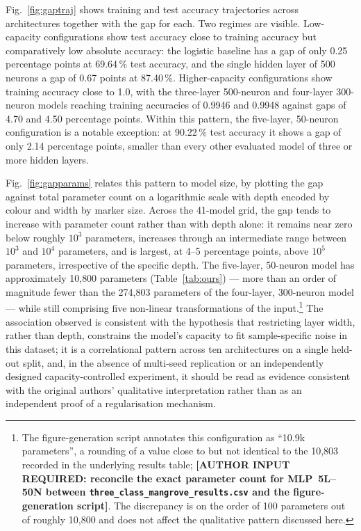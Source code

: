 \documentclass[10pt,twocolumn,a4paper]{article}
\begin{document}
Fig.~\ref{fig:gaptraj} shows training and test accuracy trajectories across architectures together
with the gap for each. Two regimes are visible. Low-capacity configurations show test accuracy close
to training accuracy but comparatively low absolute accuracy: the logistic baseline has a gap of
only 0.25 percentage points at 69.64\,\% test accuracy, and the single hidden layer of 500 neurons
a gap of 0.67 points at 87.40\,\%. Higher-capacity configurations show training accuracy close to
1.0, with the three-layer 500-neuron and four-layer 300-neuron models reaching training accuracies
of 0.9946 and 0.9948 against gaps of 4.70 and 4.50 percentage points. Within this pattern, the
five-layer, 50-neuron configuration is a notable exception: at 90.22\,\% test accuracy it shows a
gap of only 2.14 percentage points, smaller than every other evaluated model of three or more
hidden layers.

Fig.~\ref{fig:gapparams} relates this pattern to model size, by plotting the gap against total
parameter count on a logarithmic scale with depth encoded by colour and width by marker size. Across
the 41-model grid, the gap tends to increase with parameter count rather than with depth alone: it
remains near zero below roughly $10^3$ parameters, increases through an intermediate range between
$10^3$ and $10^4$ parameters, and is largest, at 4--5 percentage points, above $10^5$ parameters,
irrespective of the specific depth. The five-layer, 50-neuron model has approximately 10{,}800
parameters (Table~\ref{tab:ours}) --- more than an order of magnitude fewer than the 274{,}803
parameters of the four-layer, 300-neuron model --- while still comprising five non-linear
transformations of the input.\footnote{The figure-generation script annotates this configuration as
``10.9k parameters'', a rounding of a value close to but not identical to the 10{,}803 recorded in
the underlying results table; \textbf{[AUTHOR INPUT REQUIRED: reconcile the exact parameter count
for MLP~5L--50N between \texttt{three\_class\_mangrove\_results.csv} and the figure-generation
script]}. The discrepancy is on the order of 100 parameters out of roughly 10{,}800 and does not
affect the qualitative pattern discussed here.} The association observed is consistent with the
hypothesis that restricting layer width, rather than depth, constrains the model's capacity to fit
sample-specific noise in this dataset; it is a correlational pattern across ten architectures on a
single held-out split, and, in the absence of multi-seed replication or an independently designed
capacity-controlled experiment, it should be read as evidence consistent with the original authors'
qualitative interpretation rather than as an independent proof of a regularisation mechanism.
\end{document}
